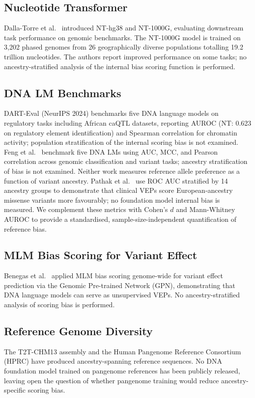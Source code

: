 \documentclass[conference]{IEEEtran}
\begin{document}
\subsection{Nucleotide Transformer}
Dalla-Torre et al.~\cite{dalla_torre_nt} introduced NT-hg38 and NT-1000G,
evaluating downstream task performance on genomic benchmarks. The NT-1000G model
is trained on 3{,}202 phased genomes from 26 geographically diverse populations
totalling 19.2 trillion nucleotides. The authors report improved performance on
some tasks; no ancestry-stratified analysis of the internal bias scoring function
is performed.

\subsection{DNA LM Benchmarks}
DART-Eval \cite{dart_eval} (NeurIPS 2024) benchmarks five DNA language models on
regulatory tasks including African caQTL datasets, reporting AUROC (NT: 0.623 on
regulatory element identification) and Spearman correlation for chromatin activity;
population stratification of the internal scoring bias is not examined.
Feng et al.~\cite{benchmark_dna_lm} benchmark five DNA LMs using AUC, MCC, and
Pearson correlation across genomic classification and variant tasks; ancestry
stratification of bias is not examined. Neither work measures reference allele
preference as a function of variant ancestry. Pathak et al.~\cite{pathak_2024}
use ROC AUC stratified by 14 ancestry groups to demonstrate that clinical VEPs
score European-ancestry missense variants more favourably; no foundation model
internal bias is measured. We complement these metrics with Cohen's $d$ and
Mann-Whitney AUROC to provide a standardised, sample-size-independent
quantification of reference bias.

\subsection{MLM Bias Scoring for Variant Effect}
Benegas et al.~\cite{gpn_benegas} applied MLM bias scoring genome-wide for
variant effect prediction via the Genomic Pre-trained Network (GPN), demonstrating
that DNA language models can serve as unsupervised VEPs. No ancestry-stratified
analysis of scoring bias is performed.

\subsection{Reference Genome Diversity}
The T2T-CHM13 assembly and the Human Pangenome Reference Consortium
(HPRC) \cite{pangenome} have produced ancestry-spanning reference sequences.
No DNA foundation model trained on pangenome references has been publicly
released, leaving open the question of whether pangenome training would reduce
ancestry-specific scoring bias.
\end{document}
